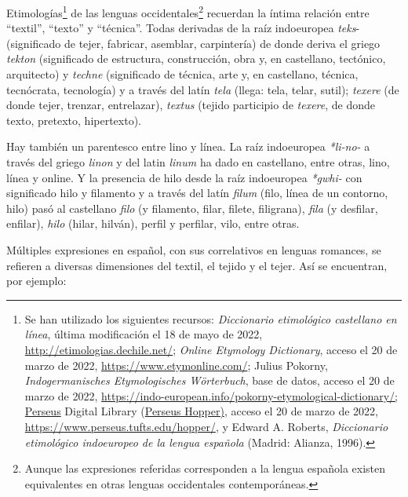 \documentclass{tufte-handout}
\begin{document}
Etimologías\footnote{Se han utilizado los siguientes recursos:
  \emph{Diccionario etimológico castellano en línea}, última
  modificación el 18 de mayo de 2022,
  \url{http://etimologias.dechile.net/}; \emph{Online Etymology
  Dictionary}, acceso el 20 de marzo de 2022,
  \url{https://www.etymonline.com/}; Julius Pokorny,
  \emph{Indogermanisches Etymologisches Wörterbuch}, base de datos,
  acceso el 20 de marzo de 2022,
  \url{https://indo-european.info/pokorny-etymological-dictionary/}\href{https://indo-european.info/pokorny-etymological-dictionary/;https://www.perseus.tufts.edu/hopper/}{;
  Perseus} Digital Library
  (\href{https://indo-european.info/pokorny-etymological-dictionary/;https://www.perseus.tufts.edu/hopper/}{Perseus
  Hopper)}, acceso el 20 de marzo de 2022,
  \url{https://www.perseus.tufts.edu/hopper/}, y Edward A. Roberts,
  \emph{Diccionario etimológico indoeuropeo de la lengua española}
  (Madrid: Alianza, 1996).} de las lenguas occidentales\footnote{Aunque
  las expresiones referidas corresponden a la lengua española existen
  equivalentes en otras lenguas occidentales contemporáneas.} recuerdan
la íntima relación entre ``textil'', ``texto'' y ``técnica''. Todas
derivadas de la raíz indoeuropea \emph{teks}- (significado de tejer,
fabricar, asemblar, carpintería) de donde deriva el griego \emph{tekton}
(significado de estructura, construcción, obra y, en castellano,
tectónico, arquitecto) y \emph{techne} (significado de técnica, arte y,
en castellano, técnica, tecnócrata, tecnología) y a través del latín
\emph{tela} (llega: tela, telar, sutil); \emph{texere} (de donde tejer,
trenzar, entrelazar), \emph{textus} (tejido participio de \emph{texere},
de donde texto, pretexto, hipertexto).

Hay también un parentesco entre lino y línea. La raíz indoeuropea
\emph{*li-no-} a través del griego \emph{linon} y del latin \emph{linum}
ha dado en castellano, entre otras, lino, línea y online. Y la presencia
de hilo desde la raíz indoeuropea \emph{*gwhi-} con significado hilo y
filamento y a través del latín \emph{filum} (filo, línea de un contorno,
hilo) pasó al castellano \emph{filo} (y filamento, filar, filete,
filigrana), \emph{fila} (y desfilar, enfilar), \emph{hilo} (hilar,
hilván), perfil y perfilar, vilo, entre otras.

Múltiples expresiones en español, con sus correlativos en lenguas
romances, se refieren a diversas dimensiones del textil, el tejido y el
tejer. Así se encuentran, por ejemplo:
\end{document}
